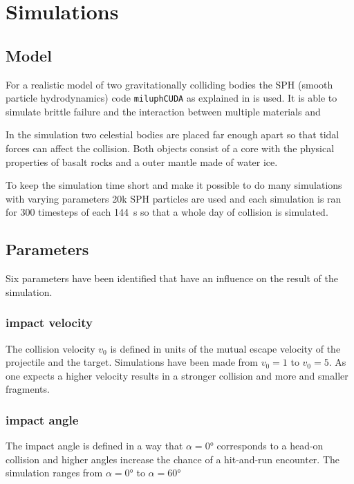 

\chapter{Simulations}

\section{Model}

For a realistic model of two gravitationally colliding bodies the SPH (smooth particle hydrodynamics) code \texttt{miluphCUDA} as explained in \cite{Schaefer2016} is used. It is able to simulate brittle failure and the interaction between multiple materials and 

In the simulation two celestial bodies are placed far enough apart so that tidal forces can affect the collision. Both objects consist of a core with the physical properties of basalt rocks and a outer mantle made of water ice. 

To keep the simulation time short and make it possible to do many simulations with varying parameters 20k SPH particles are used and each simulation is ran for 300 timesteps of each \SI{144}{\second} so that a whole day of collision is simulated.


\section{Parameters}

Six parameters have been identified that have an influence on the result of the simulation.

\subsection{impact velocity}

The collision velocity $v_0$ is defined in units of the mutual escape velocity of the projectile and the target. Simulations have been made from $v_0=1$ to $v_0=5$. As one expects a higher velocity results in a stronger collision and more and smaller fragments.

\subsection{impact angle}

The impact angle is defined in a way that $\alpha=\ang{0}$ corresponds to a head-on collision and higher angles increase the chance of a hit-and-run encounter. The simulation ranges from $\alpha=\ang{0}$ to $\alpha=\ang{60}$

